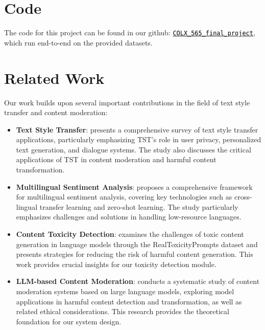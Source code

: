 \documentclass[11pt]{article}
\begin{document}
\section{Code}
The code for this project can be found in our github: \texttt{\href{https://github.ubc.ca/MDS-CL-2024-25/COLX_565_final_project}{\textcolor{black}{\faGithub \space COLX\_565\_final\_project}}}, which run end-to-end on the provided datasets.

\section{Related Work}
Our work builds upon several important contributions in the field of text style transfer and content moderation:

\begin{itemize}
    \item \textbf{Text Style Transfer}: \cite{mukherjee2024survey} presents a comprehensive survey of text style transfer applications, particularly emphasizing TST's role in user privacy, personalized text generation, and dialogue systems. The study also discusses the critical applications of TST in content moderation and harmful content transformation.
    
    \item \textbf{Multilingual Sentiment Analysis}: \cite{zhang2024survey} proposes a comprehensive framework for multilingual sentiment analysis, covering key technologies such as cross-lingual transfer learning and zero-shot learning. The study particularly emphasizes challenges and solutions in handling low-resource languages.
    
    \item \textbf{Content Toxicity Detection}: \cite{gehman2020realtoxicityprompts} examines the challenges of toxic content generation in language models through the RealToxicityPrompts dataset and presents strategies for reducing the risk of harmful content generation. This work provides crucial insights for our toxicity detection module.
    
    \item \textbf{LLM-based Content Moderation}: \cite{wang2022survey} conducts a systematic study of content moderation systems based on large language models, exploring model applications in harmful content detection and transformation, as well as related ethical considerations. This research provides the theoretical foundation for our system design.
\end{itemize}
\end{document}
